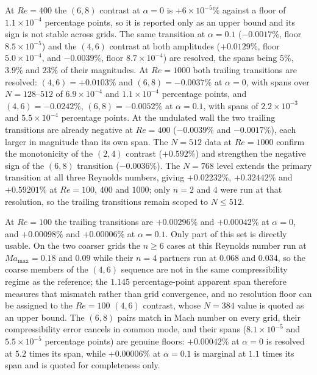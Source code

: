 At $Re=400$ the $(6,8)$ contrast at $\alpha=0$ is $+6\times 10^{-5}\%$ against a floor of $1.1\times 10^{-4}$ percentage points, so it is reported only as an upper bound and its sign is not stable across grids. The same transition at $\alpha=0.1$ ($-0.0017\%$, floor $8.5\times 10^{-5}$) and the $(4,6)$ contrast at both amplitudes ($+0.0129\%$, floor $5.0\times 10^{-4}$, and $-0.0039\%$, floor $8.7\times 10^{-4}$) are resolved, the spans being $5\%$, $3.9\%$ and $23\%$ of their magnitudes. At $Re=1000$ both trailing transitions are resolved: $(4,6)=+0.0103\%$ and $(6,8)=-0.0037\%$ at $\alpha=0$, with spans over $N=128$--$512$ of $6.9\times10^{-4}$ and $1.1\times10^{-4}$ percentage points, and $(4,6)=-0.0242\%$, $(6,8)=-0.0052\%$ at $\alpha=0.1$, with spans of $2.2\times10^{-3}$ and $5.5\times10^{-4}$ percentage points. At the undulated wall the two trailing transitions are already negative at $Re=400$ ($-0.0039\%$ and $-0.0017\%$), each larger in magnitude than its own span. The $N=512$ data at $Re=1000$ confirm the monotonicity of the $(2,4)$ contrast ($+0.592\%$) and strengthen the negative sign of the $(6,8)$ transition ($-0.0036\%$). The $N=768$ level extends the primary transition at all three Reynolds numbers, giving $+0.02232\%$, $+0.32442\%$ and $+0.59201\%$ at $Re=100$, $400$ and $1000$; only $n=2$ and $4$ were run at that resolution, so the trailing transitions remain scoped to $N\le512$.

At $Re=100$ the trailing transitions are $+0.00296\%$ and $+0.00042\%$ at $\alpha=0$, and $+0.00098\%$ and $+0.00006\%$ at $\alpha=0.1$. Only part of this set is directly usable. On the two coarser grids the $n\ge 6$ cases at this Reynolds number run at $Ma_{\max}=0.18$ and $0.09$ while their $n=4$ partners run at $0.068$ and $0.034$, so the coarse members of the $(4,6)$ sequence are not in the same compressibility regime as the reference; the $1.145$ percentage-point apparent span therefore measures that mismatch rather than grid convergence, and no resolution floor can be assigned to the $Re=100$ $(4,6)$ contrast, whose $N=384$ value is quoted as an upper bound. The $(6,8)$ pairs match in Mach number on every grid, their compressibility error cancels in common mode, and their spans ($8.1\times 10^{-5}$ and $5.5\times 10^{-5}$ percentage points) are genuine floors: $+0.00042\%$ at $\alpha=0$ is resolved at $5.2$ times its span, while $+0.00006\%$ at $\alpha=0.1$ is marginal at $1.1$ times its span and is quoted for completeness only.



